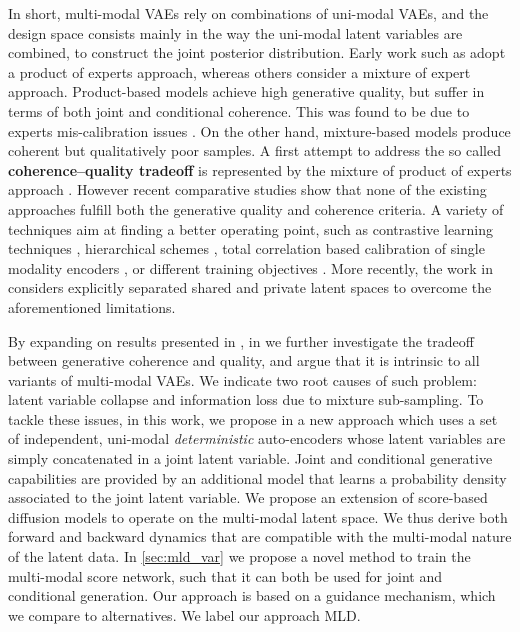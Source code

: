 In short, multi-modal \glspl{VAE} rely on combinations of uni-modal \glspl{VAE}, and the design space consists mainly in the way the uni-modal latent variables are combined, to construct the joint posterior distribution. Early work such as \cite{mvaeWu2018} adopt a product of experts approach, whereas others \cite{mmvaeShi2019} consider a mixture of expert approach. Product-based models achieve high generative quality, but suffer in terms of both joint and conditional coherence. This was found to be due to experts mis-calibration issues \citep{mmvaeShi2019, sutter2021generalized}. On the other hand, mixture-based models produce coherent but qualitatively poor samples.
A first attempt to address the so called \textbf{coherence--quality tradeoff} \citep{Daunhawer2021} is represented by the mixture of product of experts approach \citep{sutter2021generalized}. However recent comparative studies \citep{Daunhawer2021} show that none of the existing approaches fulfill both the generative quality and  coherence criteria. A variety of techniques aim at finding a better operating point, such as contrastive learning techniques \citep{contrastShi2020}, hierarchical schemes \citep{Vasco2022}, total correlation based calibration of single modality encoders \citep{tcmvaehwang21}, or different training objectives \cite{jsdSutter2020}. More recently, the work in \citep{palumbo2023mmvae} considers explicitly separated shared and private latent spaces to overcome the aforementioned limitations.

By expanding on results presented in \citep{Daunhawer2021}, in  we further investigate the tradeoff between generative coherence and quality, and argue that it is intrinsic to all variants of multi-modal \glspl{VAE}. We indicate two root causes of such problem: latent variable collapse \citep{alemi2018fixing, dieng2019avoiding} and information loss due to mixture sub-sampling. To tackle these issues, in this work, we propose in  a new approach which uses a set of independent, uni-modal \textit{deterministic} auto-encoders whose latent variables are simply concatenated in a joint latent variable. Joint and conditional generative capabilities are provided by an additional model that learns a probability density associated to the joint latent variable.
We propose an extension of score-based diffusion models \citep{Song2020} to operate on the multi-modal latent space. We thus derive both forward and backward dynamics that are compatible with the multi-modal nature of the latent data. In \cref{sec:mld_var} we propose a novel method to train the multi-modal score network, such that it can both be used for joint and conditional generation. Our approach is based on a guidance mechanism, which we compare to alternatives. We label our approach \gls{MLD}.

